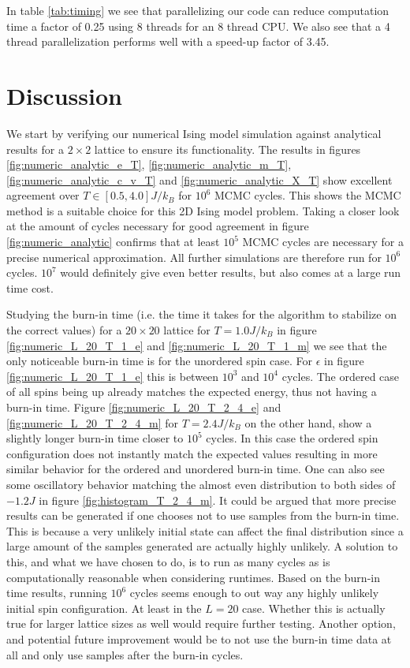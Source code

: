 \documentclass[english,notitlepage,reprint,nofootinbib]{revtex4-1}  %
\begin{document}
In table \ref{tab:timing} we see that parallelizing our code can reduce computation time a factor of 0.25 using 8 threads for an 8 thread CPU. We also see that a 4 thread parallelization performs well with a speed-up factor of 3.45.
\section{Discussion}\label{sec:discussion}
We start by verifying our numerical Ising model simulation against analytical results for a $2 \times 2$ lattice to ensure its functionality. The results in figures \ref{fig:numeric_analytic_e_T}, \ref{fig:numeric_analytic_m_T}, \ref{fig:numeric_analytic_c_v_T} and \ref{fig:numeric_analytic_X_T} show excellent agreement over $T \in [0.5, 4.0]J/k_B$ for $10^6$ MCMC cycles. This shows the MCMC method is a suitable choice for this 2D Ising model problem. Taking a closer look at the amount of cycles necessary for good agreement in figure \ref{fig:numeric_analytic} confirms that at least $10^5$ MCMC cycles are necessary for a precise numerical approximation. All further simulations are therefore run for $10^6$ cycles. $10^7$ would definitely give even better results, but also comes at a large run time cost.

Studying the burn-in time (i.e. the time it takes for the algorithm to stabilize on the correct values) for a $20 \times 20$ lattice for $T=1.0 J/k_B$ in figure \ref{fig:numeric_L_20_T_1_e} and \ref{fig:numeric_L_20_T_1_m} we see that the only noticeable burn-in time is for the unordered spin case. For $\epsilon$ in figure \ref{fig:numeric_L_20_T_1_e} this is between $10^3$ and $10^4$ cycles. The ordered case of all spins being up already matches the expected energy, thus not having a burn-in time. Figure \ref{fig:numeric_L_20_T_2_4_e} and \ref{fig:numeric_L_20_T_2_4_m} for $T=2.4 J/k_B$ on the other hand, show a slightly longer burn-in time closer to $10^5$ cycles. In this case the ordered spin configuration does not instantly match the expected values resulting in more similar behavior for the ordered and unordered burn-in time. One can also see some oscillatory behavior matching the almost even distribution to both sides of $-1.2 J$ in figure \ref{fig:histogram_T_2_4_m}.
It could be argued that more precise results can be generated if one chooses not to use samples from the burn-in time. This is because a very unlikely initial state can affect the final distribution since a large amount of the samples generated are actually highly unlikely. A solution to this, and what we have chosen to do, is to run as many cycles as is computationally reasonable when considering runtimes. Based on the burn-in time results, running $10^6$ cycles seems enough to out way any highly unlikely initial spin configuration. At least in the $L=20$ case. Whether this is actually true for larger lattice sizes as well would require further testing. Another option, and potential future improvement would be to not use the burn-in time data at all and only use samples after the burn-in cycles.
\end{document}
